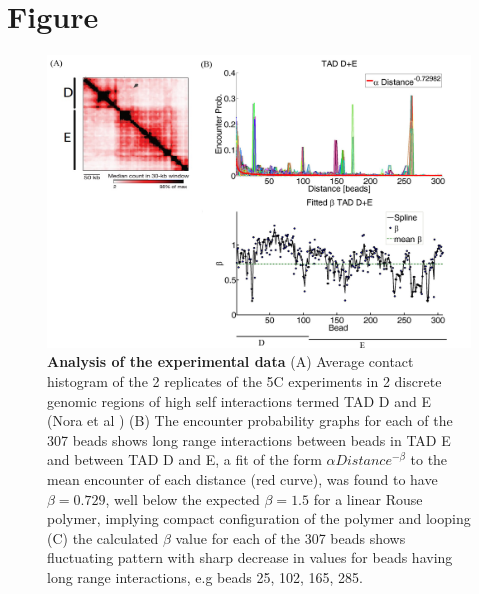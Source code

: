 \documentclass[12pt]{article}
\begin{document}
\section{Figure}\label{section_figures}
\begin{figure}[H]


\includegraphics[scale=0.7]{Figure01_AnalysisOfTheExperimentalData}
\caption{\textbf{Analysis of the experimental data} (A) Average contact histogram of the 2 replicates of the 5C experiments in 2 discrete genomic regions of high self interactions termed TAD D and E (Nora et al \cite{Nora2012}) (B) The encounter probability graphs for each of the 307 beads shows long range interactions between beads in TAD E and between TAD D and E, a fit of the form $\alpha Distance ^{-\beta}$ to the mean encounter of each distance (red curve), was found to have $\beta=0.729$, well below the expected $\beta=1.5$ for a linear Rouse polymer, implying compact configuration of the polymer and looping (C) the calculated $\beta$ value for each of the 307 beads shows fluctuating pattern with sharp decrease in values for beads having long range interactions, e.g beads 25, 102, 165, 285.}
\label{figure_TADDAndENoraEtAl2012}
\end{figure}
\end{document}
